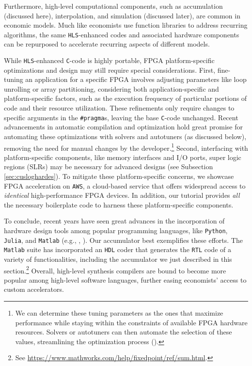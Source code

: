 \documentclass[12pt,american]{article}
\begin{document}
Furthermore, high-level computational components, such as accumulation (discussed here), interpolation, and simulation (discussed later), are common in economic models. Much like economists use function libraries to address recurring algorithms, the same \texttt{HLS}-enhanced codes and associated hardware components can be repurposed to accelerate recurring aspects of different models. 

While \texttt{HLS}-enhanced \texttt{C}-code is highly portable, FPGA platform-specific optimizations and design may still require special considerations. First, fine-tuning an application for a specific FPGA involves adjusting parameters like loop unrolling or array partitioning, considering both application-specific and platform-specific factors, such as the execution frequency of particular portions of code and their resource utilization. These refinements only require changes to specific arguments in the \texttt{\#pragma}s, leaving the base \texttt{C}-code unchanged. Recent advancements in automatic compilation and optimization hold great promise for automating these optimizations with solvers and autotuners (as discussed below), removing the need for manual changes by the developer.\footnote{We can determine these tuning parameters as the ones that maximize performance while staying within the constraints of available FPGA hardware resources. Solvers or autotuners can then automate the selection of these values, streamlining the optimization process (\citealp{atlas_ics1998,spice_fpl2009,model_based_hls_fpl2016,comba_trcad2020}).} Second, interfacing with platform-specific components, like memory interfaces and I/O ports, super logic regions (SLRs) may be necessary for advanced designs (see Subsection \ref{sec:cusloghardes}). To mitigate these platform-specific concerns, we showcase FPGA acceleration on \texttt{AWS}, a cloud-based service that offers widespread access to \textit{identical} high-performance FPGA devices. In addition, our tutorial provides \textit{all} the necessary boilerplate code to harness these platform-specific components.

To conclude, recent years have seen great advances in the incorporation of hardware design tools among popular programming languages, like \texttt{Python}, \texttt{Julia}, and \texttt{Matlab} (e.g., \citealp{quenon2021towards}, \citealp{biggs2022high}). Our accumulator best exemplifies these efforts. The \texttt{Matlab} suite has incorporated an \texttt{HDL} coder that generates the \texttt{RTL} code of a variety of functionalities, including the accumulator we just described in this section.\footnote{See \url{https://www.mathworks.com/help/fixedpoint/ref/sum.html}.}  Overall, high-level synthesis compilers are bound to become more popular among high-level software languages, further easing economists' access to custom accelerators.
\end{document}
